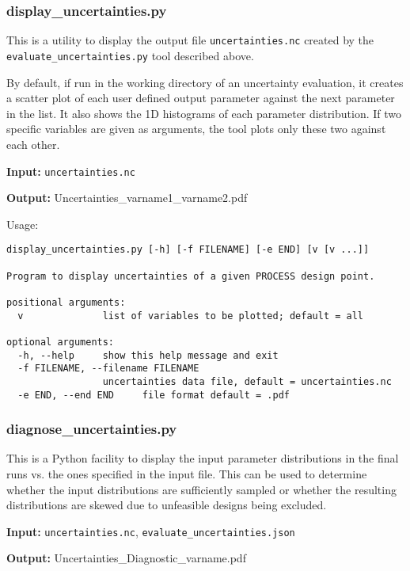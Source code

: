 \subsubsection{display\_uncertainties.py}

This is a utility to display the output file \texttt{uncertainties.nc} created by the \texttt{evaluate\_uncertainties.py} tool described above.

By default, if run in the working directory of an uncertainty evaluation, it creates a scatter plot of each user defined output parameter against the next parameter in the list.  It also shows the 1D histograms of each parameter distribution. If two specific variables are given as arguments, the tool plots only these two against each other.

\begin{description}
\item{\textbf{Input:}}
 \texttt{uncertainties.nc}

\item{\textbf{Output:}}
Uncertainties\_varname1\_varname2.pdf
\end{description}

Usage:
\begin{verbatim}
display_uncertainties.py [-h] [-f FILENAME] [-e END] [v [v ...]]

Program to display uncertainties of a given PROCESS design point.

positional arguments:
  v              list of variables to be plotted; default = all

optional arguments:
  -h, --help     show this help message and exit
  -f FILENAME, --filename FILENAME
                 uncertainties data file, default = uncertainties.nc
  -e END, --end END     file format default = .pdf
\end{verbatim}


\subsubsection{diagnose\_uncertainties.py}
This is a Python facility to display the input parameter distributions in the final runs vs. the ones specified in the input file. This can be used to determine whether the input distributions are sufficiently sampled or whether the resulting distributions are skewed due to unfeasible designs being excluded. 

\begin{description}
\item{\textbf{Input:}}
 \texttt{uncertainties.nc}, \texttt{evaluate\_uncertainties.json}
                                
\item{\textbf{Output:}}
Uncertainties\_Diagnostic\_varname.pdf
\end{description}


